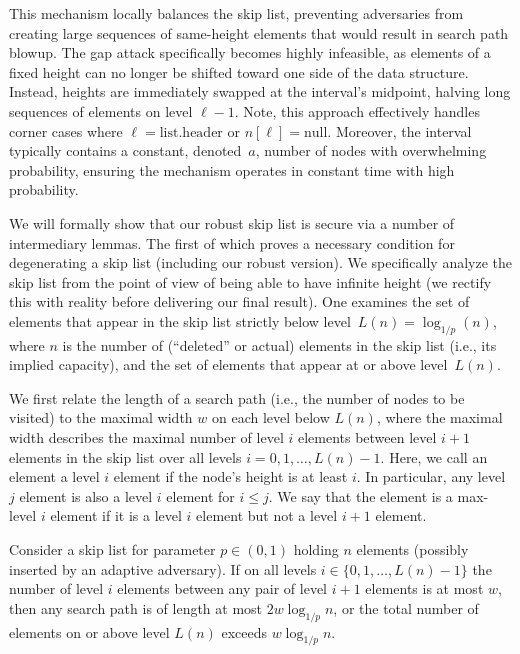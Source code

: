 This mechanism locally balances the skip list, preventing adversaries from creating large sequences of same-height elements that would result in search path blowup. The gap attack specifically becomes highly infeasible, as elements of a fixed height can no longer be shifted toward one side of the data structure. Instead, heights are immediately swapped at the interval's midpoint, halving long sequences of elements on level $\ell-1$. Note, this approach effectively handles corner cases where $\ell = \text{list.header}$ or $n[\ell] = \text{null}$. Moreover, the interval typically contains a constant, denoted~$a$, number of nodes with overwhelming probability, ensuring the mechanism operates in constant time with high probability.

We will formally show that our robust skip list is secure via a number of intermediary lemmas. The first of which proves a necessary condition for degenerating a skip list (including our robust version). We specifically analyze the skip list from the point of view of being able to have infinite height (we rectify this with reality before delivering our final result). One examines the set of elements that appear in the skip list strictly below level~$L(n) = \log_{1/p}(n)$, where $n$ is the number of (``deleted'' or actual) elements in the skip list (i.e., its implied capacity), and the set of elements that appear at or above level~$L(n)$.

We first relate the length of a search path (i.e., the number of nodes to be visited) to the maximal width $w$ on each level below $L(n)$, where the maximal width describes the maximal number of level $i$ elements between level $i+1$ elements in the skip list over all levels $i=0,1,\dots, L(n)-1$.  Here, we call an element a level $i$ element if the node's height is at least $i$. In particular, any level $j$ element is also a level $i$ element for $i\le j$. We say that the element is a max-level $i$ element if it is a level $i$ element but not a level $i+1$ element.

\begin{lemma}\label{lemma:ncdsl}
Consider a skip list for parameter $p\in(0,1)$ holding $n$ elements (possibly inserted by an adaptive adversary). If on all levels $i\in\{0,1,\dots, L(n)-1\}$ the number of level $i$ elements between any pair of level $i+1$ elements is at most $w$, then any search path is of length at most $2w\log_{1/p}n$, or the total number of elements on or above level $L(n)$ exceeds $w\log_{1/p}n$. 
\end{lemma}

